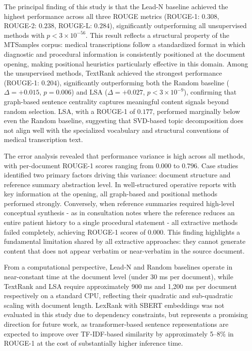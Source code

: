 \documentclass[10pt]{book}
\begin{document}
The principal finding of this study is that the Lead-N baseline achieved the highest performance across all three ROUGE metrics (ROUGE-1: $0.308$, ROUGE-2: $0.238$, ROUGE-L: $0.284$), significantly outperforming all unsupervised methods with $p < 3 \times 10^{-56}$. This result reflects a structural property of the MTSamples corpus: medical transcriptions follow a standardized format in which diagnostic and procedural information is consistently positioned at the document opening, making positional heuristics particularly effective in this domain. Among the unsupervised methods, TextRank achieved the strongest performance (ROUGE-1: $0.204$), significantly outperforming both the Random baseline ($\Delta = +0.015$, $p = 0.006$) and LSA ($\Delta = +0.027$, $p < 3 \times 10^{-9}$), confirming that graph-based sentence centrality captures meaningful content signals beyond random selection. LSA, with a ROUGE-1 of $0.177$, performed marginally below even the Random baseline, suggesting that SVD-based topic decomposition does not align well with the specialized vocabulary and structural conventions of medical transcription text.

The error analysis revealed that performance variance is high across all methods, with per-document ROUGE-1 scores ranging from $0.000$ to $0.796$. Case studies identified two primary factors driving this variance: document structure and reference summary abstraction level. In well-structured operative reports with key information at the opening, all graph-based and positional methods performed strongly. Conversely, when reference summaries required high-level conceptual synthesis - as in consultation notes where the reference reduces an entire patient history to a single procedural statement - all extractive methods failed completely, achieving ROUGE-1 scores of $0.000$. This finding highlights a fundamental limitation shared by all extractive approaches: they cannot generate content that does not appear verbatim or near-verbatim in the source document.

From a computational perspective, Lead-N and Random baselines operate in near-constant time at the document level (under 30 ms per document), while TextRank and LSA require approximately 900 ms and 1,200 ms per document respectively on a standard CPU, reflecting their quadratic and sub-quadratic scaling with document length. LexRank with SBERT embeddings was not evaluated in this study due to dependency constraints, but represents a promising direction for future work, as transformer-based sentence representations are expected to improve over TF-IDF-based similarity by approximately 5–8\% in ROUGE-1 at the cost of substantially higher inference time.
\end{document}

